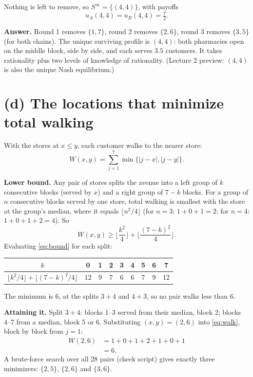 \documentclass[11pt,a4paper]{article}
\newcommand{\answer}[1]{\begin{tcolorbox}[colback=ans!5,colframe=ans,boxrule=0.6pt,
  left=5pt,right=5pt,top=3pt,bottom=3pt]\textbf{Answer.} #1\end{tcolorbox}}
\begin{document}
Nothing is left to remove, so $S^\infty = \{(4, 4)\}$, with payoffs
\[
  u_A(4, 4) = u_B(4, 4) = \tfrac72.
\]

\answer{Round 1 removes $\{1, 7\}$, round 2 removes $\{2, 6\}$, round 3 removes $\{3, 5\}$ (for
both chains). The unique surviving profile is $(4, 4)$: both pharmacies open on the middle block,
side by side, and each serves $3.5$ customers. It takes rationality plus two levels of knowledge
of rationality. (Lecture 2 preview: $(4,4)$ is also the unique Nash equilibrium.)}

\section*{(d) The locations that minimize total walking}

With the stores at $x \le y$, each customer walks to the nearer store:
\begin{equation}
  W(x, y) = \sum_{j=1}^{7} \min\{|j - x|, |j - y|\}. \label{eq:walk}
\end{equation}

\textbf{Lower bound.} Any pair of stores splits the avenue into a left group of $k$ consecutive
blocks (served by $x$) and a right group of $7 - k$ blocks. For a group of $n$ consecutive blocks
served by one store, total walking is smallest with the store at the group's median, where it
equals $\lfloor n^2/4 \rfloor$ (for $n = 3$: $1 + 0 + 1 = 2$; for $n = 4$: $1 + 0 + 1 + 2 = 4$).
So
\begin{equation}
  W(x, y) \ge \Big\lfloor \frac{k^2}{4} \Big\rfloor + \Big\lfloor \frac{(7 - k)^2}{4} \Big\rfloor.
  \label{eq:bound}
\end{equation}
Evaluating \eqref{eq:bound} for each split:
\begin{center}
\begin{tabular}{c|cccccccc}
$k$ & 0 & 1 & 2 & 3 & 4 & 5 & 6 & 7 \\ \midrule
$\lfloor k^2/4\rfloor + \lfloor (7-k)^2/4\rfloor$ & 12 & 9 & 7 & 6 & 6 & 7 & 9 & 12
\end{tabular}
\end{center}
The minimum is 6, at the splits $3 + 4$ and $4 + 3$, so no pair walks less than 6.

\textbf{Attaining it.} Split $3 + 4$: blocks 1--3 served from their median, block 2; blocks
4--7 from a median, block 5 or 6. Substituting $(x, y) = (2, 6)$ into \eqref{eq:walk}, block by
block from $j = 1$:
\begin{align*}
  W(2, 6) &= 1 + 0 + 1 + 2 + 1 + 0 + 1\\
          &= 6.
\end{align*}
A brute-force search over all 28 pairs (check script) gives exactly three minimizers:
$\{2, 5\}$, $\{2, 6\}$ and $\{3, 6\}$.
\end{document}
